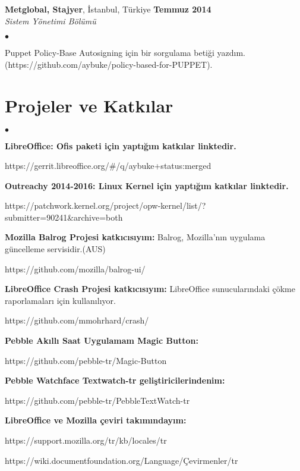\documentclass[margin,line]{res}
\newenvironment{list2}{
  \begin{list}{$\bullet$}{%
      \setlength{\itemsep}{0in}
      \setlength{\parsep}{0in} \setlength{\parskip}{0in}
      \setlength{\topsep}{0in} \setlength{\partopsep}{0in}
      \setlength{\leftmargin}{0.1in}}}{\end{list}}
\begin{document}
\begin{resume}
{\bf Metglobal, Stajyer}, \.{I}stanbul, T\"{u}rkiye \hfill {\bf Temmuz 2014}\\

\vspace{-.7cm}
{\em Sistem Y\"{o}netimi B\"{o}l\"{u}m\"{u} }
\vspace*{+.05in}
\begin{list2}
\item Puppet Policy-Base Autosigning i\c{c}in bir sorgulama beti\u{g}i yazd{\i}m. (https://github.com/aybuke/policy-based-for-PUPPET).
\end{list2}

\section{\sc Projeler ve Katk{\i}lar}
\begin{list2}
\item {\bf LibreOffice: Ofis paketi i\c{c}in yapt{\i}\u{g}{\i}m katk{\i}lar linktedir.}

https://gerrit.libreoffice.org/\#/q/aybuke+status:merged
\item {\bf Outreachy 2014-2016: Linux Kernel i\c{c}in yapt{\i}\u{g}{\i}m katk{\i}lar linktedir.}

https://patchwork.kernel.org/project/opw-kernel/list/?submitter=90241\&archive=both
\item {\bf Mozilla Balrog Projesi katk{\i}c{\i}s{\i}y{\i}m:} Balrog, Mozilla'n{\i}n uygulama g\"{u}ncelleme servisidir.(AUS)

https://github.com/mozilla/balrog-ui/
\item {\bf LibreOffice Crash Projesi katk{\i}c{\i}s{\i}y{\i}m:}  LibreOffice sunucular{\i}ndaki \c{c}\"{o}kme raporlamalar{\i} i\c{c}in kullan{\i}l{\i}yor.

https://github.com/mmohrhard/crash/
\item {\bf Pebble Ak{\i}ll{\i} Saat Uygulamam Magic Button:}

https://github.com/pebble-tr/Magic-Button
\item {\bf Pebble Watchface Textwatch-tr geli\c{s}tiricilerindenim:}

https://github.com/pebble-tr/PebbleTextWatch-tr
\item {\bf LibreOffice ve Mozilla \c{c}eviri tak{\i}m{\i}nday{\i}m:}

https://support.mozilla.org/tr/kb/locales/tr

https://wiki.documentfoundation.org/Language/\c{C}evirmenler/tr
\end{list2}
\vspace{-.3cm}


\end{resume}
\end{document}
